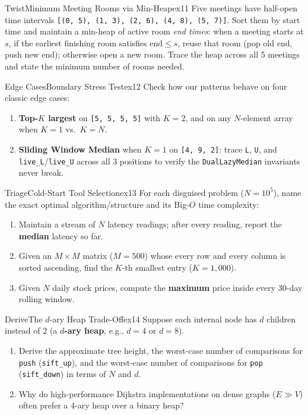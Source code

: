 \documentclass[11pt,a4paper]{article}
\theoremstyle{definition}
\begin{document}
\begin{tryitbox}{Twist}{Minimum Meeting Rooms via Min-Heap}{ex11}
Five meetings have half-open time intervals \texttt{[(0, 5), (1, 3), (2, 6), (4, 8), (5, 7)]}. Sort them by start time and maintain a min-heap of active room \emph{end times}: when a meeting starts at $s$, if the earliest finishing room satisfies $\text{end} \le s$, reuse that room (pop old end, push new end); otherwise open a new room. Trace the heap across all 5 meetings and state the minimum number of rooms needed.
\end{tryitbox}

\begin{tryitbox}{Edge Cases}{Boundary Stress Test}{ex12}
Check how our patterns behave on four classic edge cases:
\begin{enumerate}[itemsep=1pt, topsep=2pt]
    \item \textbf{Top-$K$ largest} on \texttt{[5, 5, 5, 5]} with $K = 2$, and on any $N$-element array when $K = 1$ vs.\ $K = N$.
    \item \textbf{Sliding Window Median} when $K = 1$ on \texttt{[4, 9, 2]}: trace \texttt{L}, \texttt{U}, and \texttt{live\_L}/\texttt{live\_U} across all 3 positions to verify the \texttt{DualLazyMedian} invariants never break.
\end{enumerate}
\end{tryitbox}

\begin{tryitbox}{Triage}{Cold-Start Tool Selection}{ex13}
For each disguised problem ($N = 10^5$), name the exact optimal algorithm/structure and its Big-$O$ time complexity:
\begin{enumerate}[itemsep=1pt, topsep=2pt]
    \item Maintain a stream of $N$ latency readings; after every reading, report the \textbf{median} latency so far.
    \item Given an $M \times M$ matrix ($M = 500$) whose every row and every column is sorted ascending, find the $K$-th smallest entry ($K = 1{,}000$).
    \item Given $N$ daily stock prices, compute the \textbf{maximum} price inside every 30-day rolling window.
\end{enumerate}
\end{tryitbox}

\begin{tryitbox}{Derive}{The $d$-ary Heap Trade-Off}{ex14}
Suppose each internal node has $d$ children instead of $2$ (a \textbf{$d$-ary heap}, e.g., $d = 4$ or $d = 8$).
\begin{enumerate}[itemsep=1pt, topsep=2pt]
    \item Derive the approximate tree height, the worst-case number of comparisons for \texttt{push} (\texttt{sift\_up}), and the worst-case number of comparisons for \texttt{pop} (\texttt{sift\_down}) in terms of $N$ and $d$.
    \item Why do high-performance Dijkstra implementations on dense graphs ($E \gg V$) often prefer a $4$-ary heap over a binary heap?
\end{enumerate}
\end{tryitbox}
\end{document}
